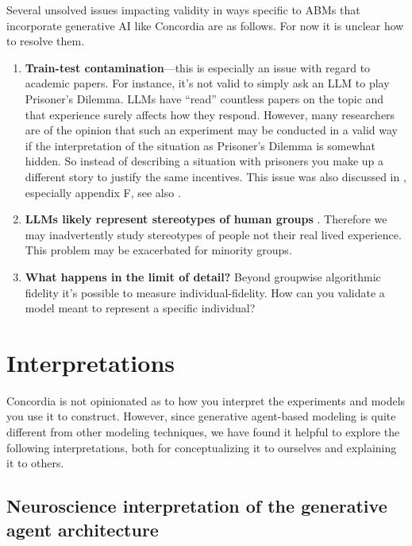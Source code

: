 \documentclass[11pt, a4paper, logo, twocolumn, internal, copyright, numbering]{googledeepmind}
\begin{document}
Several unsolved issues impacting validity in ways specific to ABMs that incorporate generative AI like Concordia are as follows. For now it is unclear how to resolve them.
\begin{enumerate}
    \item \textbf{Train-test contamination}---this is especially an issue with regard to academic papers. For instance, it's not valid to simply ask an LLM to play Prisoner's Dilemma. LLMs have ``read'' countless papers on the topic and that experience surely affects how they respond. However, many researchers are of the opinion that such an experiment may be conducted in a valid way if the interpretation of the situation as Prisoner's Dilemma is somewhat hidden. So instead of describing a situation with prisoners you make up a different story to justify the same incentives. This issue was also discussed in \cite{aher2023using}, especially appendix F, see also \cite{ullman2023large}.
    
    \item \textbf{LLMs likely represent stereotypes of human groups} \citep{weidinger2021ethical}. Therefore we may inadvertently study stereotypes of people not their real lived experience. This problem may be exacerbated for minority groups.

    \item \textbf{What happens in the limit of detail?} Beyond groupwise algorithmic fidelity it's possible to measure individual-fidelity. How can you validate a model meant to represent a specific individual?
\end{enumerate}


\section{Interpretations}
\label{sec:interpretations}

Concordia is not opinionated as to how you interpret the experiments and models you use it to construct. However, since generative agent-based modeling is quite different from other modeling techniques, we have found it helpful to explore the following interpretations,  both for conceptualizing it to ourselves and explaining it to others. 

\subsection{Neuroscience interpretation of the generative agent architecture}
\end{document}
